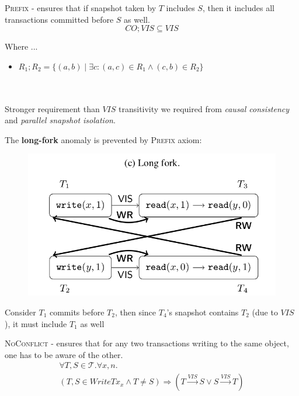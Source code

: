 \documentclass{beamer}
\begin{document}
\begin{frame}
	\begin{definition}[Prefix]
		\textsc{Prefix} - ensures that if snapshot taken by $T$ includes $S$, then it includes all transactions committed before $S$ as well.
		$$ CO; VIS \subseteq VIS $$
	\end{definition}
	Where ...
	\begin{itemize}
		\item $R_1;R_2 = \{(a,b) \mid \exists c: (a,c) \in R_1 \wedge (c,b) \in R_2\} $
	\end{itemize}
	\hfill \\
	\hfill \\
	Stronger requirement than $VIS$ transitivity we required from \textit{causal consistency} and \textit{parallel snapshot isolation}.
\end{frame}

\begin{frame}
	The \textbf{long-fork} anomaly is prevented by \textsc{Prefix} axiom:
	\begin{figure}
		\includegraphics[scale=0.3]{fig2c}
	\end{figure}
	\begin{example}
		Consider $T_1$ commits before $T_2$, then since $T_4$'s snapshot contains $T_2$ (due to $VIS$), it must include $T_1$ as well
	\end{example}
\end{frame}

\begin{frame}
	\begin{definition}
		\textsc{NoConflict} - ensures that for any two transactions writing to the same object, one has to be aware of the other.
		\begin{multline*}
		\forall T,S \in \mathcal{T}. \forall x,n . \\
		\left( T,S \in WriteTx_x \wedge T \ne S \right)
		\Rightarrow
		\left( T \xrightarrow{VIS} S \vee S \xrightarrow{VIS} T \right)
		\end{multline*}
	\end{definition}
\end{frame}
\end{document}
